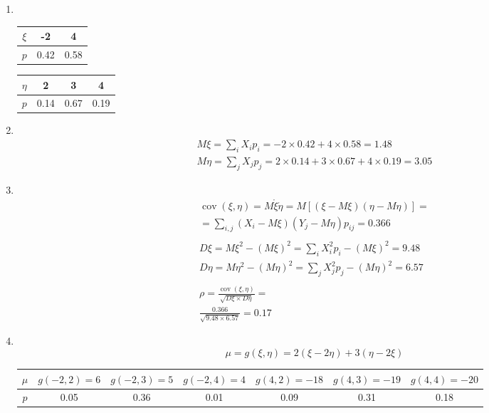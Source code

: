 \documentclass[12pt]{article}
\DeclareMathOperator{\cov}{cov}
\begin{document}
\begin{enumerate}
	\item \mbox{}\\
	      \begin{tabular}{|c|c|c|}
		      \hline
		      $\xi $ & -2   & 4    \\
		      \hline
		      $p$    & 0.42 & 0.58 \\
		      \hline
	      \end{tabular}
	      \begin{tabular}{|c|c|c|c|}
		      \hline
		      $\eta $ & 2    & 3    & 4    \\
		      \hline
		      $p$     & 0.14 & 0.67 & 0.19 \\
		      \hline
	      \end{tabular}

	\item \mbox{}\\
	      \begin{gather*}
		      M\xi = \sum_iX_ip_i = -2 \times 0.42 + 4 \times 0.58 = 1.48 \\
		      M\eta = \sum_jX_jp_j = 2 \times 0.14 + 3 \times 0.67 + 4 \times 0.19 = 3.05
	      \end{gather*}

	\item \mbox{}\\
	      \begin{gather*}
		      \cov(\xi, \eta) = M\mathring{\xi}\mathring{\eta} = M[(\xi - M\xi)(\eta - M\eta)] = \\
		      = \sum_{i,j}(X_i - M\xi)(Y_j - M\eta)p_{ij} = 0.366
		      \\\\
		      D\xi = M\xi^2 - (M\xi)^2 = \sum_iX_i^2p_i - (M\xi)^2 = 9.48 \\
		      D\eta = M\eta^2 - (M\eta)^2 = \sum_jX_j^2p_j - (M\eta)^2 = 6.57
		      \\\\
		      \rho = \frac{\cov(\xi, \eta)}{\sqrt{D\xi \times D\eta}} = \\
		      \frac{0.366}{\sqrt{9.48 \times 6.57}} = 0.17
	      \end{gather*}

	\item \mbox{}\\
	      \[\mu = g(\xi, \eta) = 2(\xi - 2\eta) + 3(\eta - 2\xi)\]
	      \begin{tabular}{|c|c|c|c|c|c|c|}
		      \hline
		      $\mu$ & $g(-2, 2) = 6$  & $g(-2, 3) = 5$  & $g(-2, 4) = 4$
		            & $g(4, 2) = -18$ & $g(4, 3) = -19$ & $g(4, 4) = -20$                      \\
		      \hline
		      $p$   & 0.05            & 0.36            & 0.01            & 0.09 & 0.31 & 0.18 \\
		      \hline
	      \end{tabular} \\


\end{enumerate}
\end{document}

